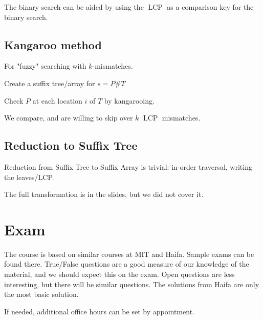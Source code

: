 \documentclass[a4paper]{article}
\DeclareMathOperator{\LCP}{LCP}
\begin{document}
The binary search can be aided by using the $\LCP$ as a comparison key for the binary search.

\subsection{Kangaroo method}
For "fuzzy" searching with $k$-mismatches.

Create a suffix tree/array for $s=P\#T$

Check $P$ at each location $i$ of $T$ by kangarooing.

We compare, and are willing to skip over $k$ $\LCP$ mismatches.

\subsection{Reduction to Suffix Tree}
Reduction from Suffix Tree to Suffix Array is trivial: in-order traversal, writing the leaves/LCP.

The full transformation is in the slides, but we did not cover it.

\section{Exam}

The course is based on similar courses at MIT and Haifa.
Sample exams can be found there.
True/False questions are a good measure of our knowledge of the material, and we should expect this on the exam.
Open questions are less interesting, but there will be similar questions.
The solutions from Haifa are only the most basic solution.

If needed, additional office hours can be set by appointment.
\end{document}
